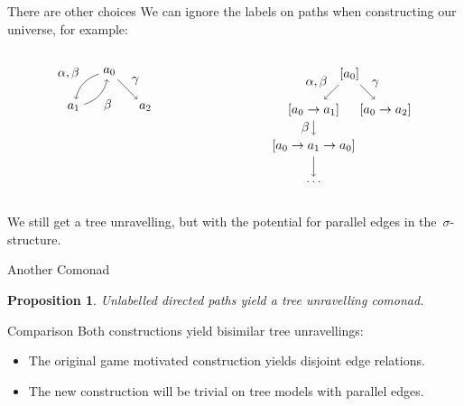 \documentclass{beamer}
\newcommand{\sg}{\sigma}
\newtheorem{proposition}{Proposition}
\begin{document}
\begin{frame}{There are other choices}
We can ignore the labels on paths when constructing our universe, for example:
\begin{columns}
\begin{column}{0.5\textwidth}
\begin{equation*}
    \begin{tikzpicture}
    \path node(a0) {$a_0$} +(-1,-1) node (a1) {$a_1$} +(1,-1) node(a2) {$a_2$};
    \path[->] 
    (a0) edge[bend right] node[midway, above left]{$\alpha, \beta$} (a1)
    (a1) edge[bend right] node[midway, below right]{$\beta$} (a0)
    (a0) edge node[midway, above right]{$\gamma$} (a2);
    \end{tikzpicture}
\end{equation*}
\end{column}
\begin{column}{0.5\textwidth}
\begin{equation*}
    \begin{tikzpicture}
    \path 
    node (a) {$[a_0]$} +(-1,-1) 
    node (b) {$[a_0 \rightarrow a_1]$} ++(1,-1)
    node (c) {$[a_0 \rightarrow a_2]$} (b) ++(0,-1)
    node (a') {$[a_0 \rightarrow a_1 \rightarrow a_0]$} ++(0,-1)
    node (dots) {$\ldots$};
    \path[->]
    (a) edge node[midway, above left]{$\alpha, \beta$} (b)
    (a) edge node[midway, above right]{$\gamma$} (c)
    (b) edge node[midway, left]{$\beta$} (a')
    (a') edge (dots);
    \end{tikzpicture}
\end{equation*}
\end{column}
\end{columns}
We still get a tree unravelling, but with the potential for parallel edges in the~$\sg$-structure.
\end{frame}

\begin{frame}{Another Comonad}

    \begin{proposition}
    Unlabelled directed paths yield a tree unravelling comonad.
    \end{proposition}

    \begin{block}{Comparison}
    Both constructions yield bisimilar tree unravellings:
    \begin{itemize}
        \item The original game motivated construction yields disjoint edge relations.
        \item The new construction will be trivial on tree models with parallel edges.
    \end{itemize}
    \end{block}
\end{frame}
\end{document}
